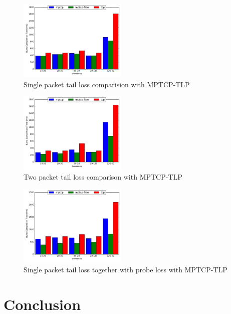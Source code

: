 \documentclass[10pt,draftcls,twocolumn]{IEEEconf}
\begin{document}
\begin{figure}[!ht]
\begin{center}
\includegraphics[angle=0, width=0.46\textwidth, natwidth=578.16,natheight=433.62]{plots/1PNew.pdf}
\caption{Single packet tail loss comparision with MPTCP-TLP}\label{1pn}
\end{center}
\end{figure}

\begin{figure}[!ht]
\begin{center}
\includegraphics[angle=0, width=0.46\textwidth, natwidth=578.16,natheight=433.62]{plots/2PNew.pdf}
\caption{Two packet tail loss comparison with MPTCP-TLP}\label{2pn}
\end{center}
\end{figure}

\begin{figure}[!ht]
\begin{center}
\includegraphics[angle=0, width=0.46\textwidth, natwidth=578.16,natheight=433.62]{plots/1PPNew.pdf}
\caption{Single packet tail loss together with probe loss with MPTCP-TLP}\label{1ppn}
\end{center}
\end{figure}


\section{Conclusion}\label{conc}



\end{document}
